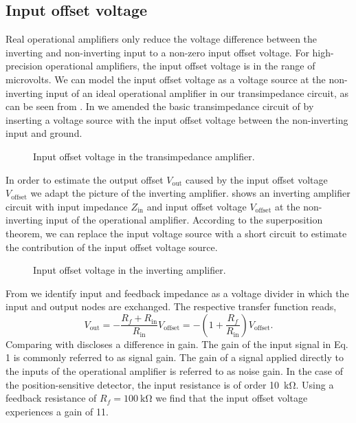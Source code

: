 \subsection{Input offset voltage}

Real operational amplifiers only reduce the voltage difference between the inverting and non-inverting input to a non-zero input offset voltage.
For high-precision operational amplifiers, the input offset voltage is in the range of microvolts.
We can model the input offset voltage as a voltage source at the non-inverting input of an ideal operational amplifier in our transimpedance circuit, as can be seen from .
In  we amended the basic transimpedance circuit of  by inserting a voltage source with the input offset voltage between the non-inverting input and ground.
\begin{figure}[H]
	\centering
	
	\caption{Input offset voltage in the transimpedance amplifier.}\label{fig:input_offset_voltage_transimpedance}
\end{figure}
In order to estimate the output offset $V_\text{out}$ caused by the input offset voltage $V_\text{offset}$ we adapt the picture of the inverting amplifier.
 shows an inverting amplifier circuit with input impedance $Z_\text{in}$ and input offset voltage $V_\text{offset}$ at the non-inverting input of the operational amplifier.
According to the superposition theorem, we can replace the input voltage source with a short circuit to estimate the contribution of the input offset voltage source.
\begin{figure}[H]
	\centering
	
	\caption{Input offset voltage in the inverting amplifier.}\label{fig:input_offset_voltage_inverting}
\end{figure}
From  we identify input and feedback impedance as a voltage divider in which the input and output nodes are exchanged.
The respective transfer function reads,
\begin{equation}
	V_\text{out}=-\frac{R_f+R_\text{in}}{R_\text{in}}V_\text{offset}=-\left(1+\frac{R_f}{R_\text{in}}\right)V_\text{offset}
	\label{eq:input_offset_voltage}.
\end{equation}
Comparing  with  discloses a difference in gain.
The gain of the input signal in Eq. 1 is commonly referred to as signal gain. 
The gain of a signal applied directly to the inputs of the operational amplifier is referred to as noise gain.
In the case of the position-sensitive detector, the input resistance is of order \SI{10}{\kilo\ohm}.
Using a feedback resistance of $R_f=\SI{100}{\kilo\ohm}$ we find that the input offset voltage experiences a gain of 11.

